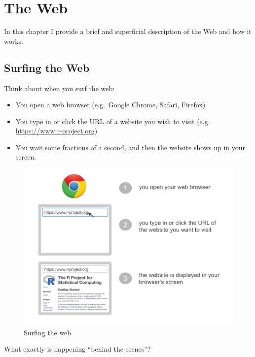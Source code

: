 \documentclass[
]{book}
\begin{document}
\hypertarget{web}{%
\chapter{The Web}\label{web}}

In this chapter I provide a brief and superficial description of the Web and
how it works.

\hypertarget{surfing-the-web}{%
\section{Surfing the Web}\label{surfing-the-web}}

Think about when you surf the web:

\begin{itemize}
\item
  You open a web browser (e.g.~Google Chrome, Safari, Firefox)
\item
  You type in or click the URL of a website you wish to visit (e.g.~
  \url{https://www.r-project.org})
\item
  You wait some fractions of a second, and then the website shows up in your
  screen.
\end{itemize}

\begin{figure}

{\centering \includegraphics[width=0.7\linewidth]{images/http/web-scheme1} 

}

\caption{Surfing the web}\label{fig:unnamed-chunk-4}
\end{figure}

What exactly is happening ``behind the scenes''?
\end{document}
